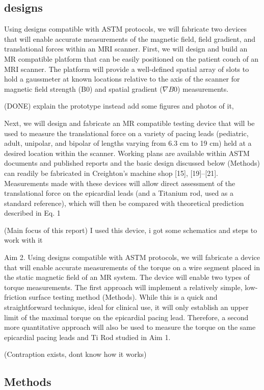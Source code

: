\subsection{designs}
Using designs compatible with ASTM protocols, we will fabricate two devices that will enable accurate
measurements of the magnetic field, field gradient, and translational forces within an MRI scanner. First, we will design
and build an MR compatible platform that can be easily positioned on the patient couch of an MRI scanner. The platform
will provide a well-defined spatial array of slots to hold a gaussmeter at known locations relative to the axis of the scanner
for magnetic field strength (B0) and spatial gradient ($\nabla B0$) measurements. 

(DONE) explain the prototype instead add some figures and photos of it, 

Next, we will design and fabricate an MR
compatible testing device that will be used to measure the translational force on a variety of pacing leads (pediatric, adult,
unipolar, and bipolar of lengths varying from 6.3 cm to 19 cm) held at a desired location within the scanner. Working plans
are available within ASTM documents and published reports and the basic design discussed below (Methods) can readily
be fabricated in Creighton’s machine shop [15], [19]–[21]. Measurements made with these devices will allow direct
assessment of the translational force on the epicardial leads (and a Titanium rod, used as a standard reference), which will
then be compared with theoretical prediction described in Eq. 1

(Main focus of this report) I used this device, i got some schematics and steps to work with it

Aim 2. Using designs compatible with ASTM protocols, we will fabricate a device that will enable accurate measurements
of the torque on a wire segment placed in the static magnetic field of an MR system. The device will enable two types of
torque measurements. The first approach will implement a relatively simple, low-friction surface testing method (Methods).
While this is a quick and straightforward technique, ideal for clinical use, it will only establish an upper limit of the maximal
torque on the epicardial pacing lead. Therefore, a second more quantitative approach will also be used to measure the torque
on the same epicardial pacing leads and Ti Rod studied in Aim 1.

(Contraption exists, dont know how it works)


\subsection{Methods}


